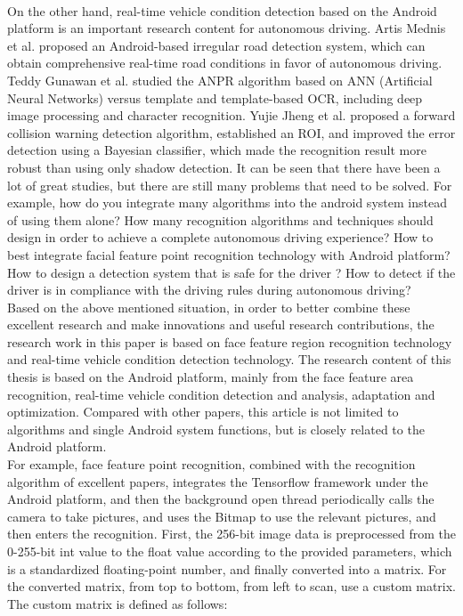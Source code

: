 \documentclass[12pt, a4paper]{article}
\begin{document}
\\On the other hand, real-time vehicle condition detection based on the Android platform is an important research content for autonomous driving. Artis Mednis et al. proposed an Android-based irregular road detection system, which can obtain comprehensive real-time road conditions in favor of autonomous driving.
Teddy Gunawan et al. \cite{ts} studied the ANPR algorithm based on ANN (Artificial Neural Networks) versus template and template-based OCR, including deep image processing and character recognition. Yujie Jheng et al. \cite{yj} proposed a forward collision warning detection algorithm, established an ROI, and improved the error detection using a Bayesian classifier, which made the recognition result more robust than using only shadow detection. It can be seen that there have been a lot of great studies, but there are still many problems that need to be solved. For example, how do you integrate many algorithms into the android system instead of using them alone? How many recognition algorithms and techniques should design in order to achieve a complete autonomous driving experience? How to best integrate facial feature point recognition technology with Android platform? How to design a detection system that is safe for the driver \cite{yee}? How to detect if the driver is in compliance with the driving rules during autonomous driving?
\\Based on the above mentioned situation, in order to better combine these excellent research and make innovations and useful research contributions, the research work in this paper is based on face feature region recognition technology and real-time vehicle condition detection technology. The research content of this thesis is based on the Android platform, mainly from the face feature area recognition, real-time vehicle condition detection and analysis, adaptation and optimization. Compared with other papers, this article is not limited to algorithms and single Android system functions, but is closely related to the Android platform.\\
For example, face feature point recognition, combined with the recognition algorithm of excellent papers, integrates the Tensorflow framework under the Android platform, and then the background open thread periodically calls the camera to take pictures, and uses the Bitmap to use the relevant pictures, and then enters the recognition. First, the 256-bit image data is preprocessed from the 0-255-bit int value to the float value according to the provided parameters, which is a standardized floating-point number, and finally converted into a matrix. For the converted matrix, from top to bottom, from left to scan, use a custom matrix. The custom matrix is defined as follows:
\end{document}
